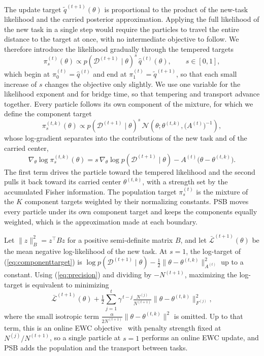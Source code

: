 \documentclass{article}
\begin{document}
The update target $\tilde q^{(t+1)}(\theta)$ is proportional to the product of the new-task likelihood and the carried posterior approximation.
Applying the full likelihood of the new task in a single step would require
the particles to travel the entire distance to the target at once, with no
intermediate objective to follow. We therefore introduce the likelihood
gradually through the tempered targets
\begin{equation}
    \pi^{(t)}_{s}(\theta)\propto p(\mathcal{D}^{(t+1)}\mid\theta)^{s}\,
    \hat q^{(t)}(\theta), \qquad s\in[0,1],
    \label{eq:tempered}
\end{equation}
which begin at $\pi^{(t)}_{0}=\hat q^{(t)}$ and end at
$\pi^{(t)}_{1}=\tilde q^{(t+1)}$, so that each small increase of $s$ changes
the objective only slightly. We use one variable for the likelihood exponent
and for bridge time, so that tempering and transport advance together. Every
particle follows its own component of the mixture, for which we define the
component target
\begin{equation}
    \pi^{(t,k)}_{s}(\theta)\propto p(\mathcal{D}^{(t+1)}\mid\theta)^{s}\,
    \mathcal{N}\!\left(\theta;\theta^{(t,k)},\big(A^{(t)}\big)^{-1}\right),
    \label{eq:componenttarget}
\end{equation}
whose log-gradient separates into the contributions of the new task and of the
carried center,
\begin{equation}
    \nabla_\theta\log\pi^{(t,k)}_{s}(\theta)
    = s\,\nabla_\theta\log p(\mathcal{D}^{(t+1)}\mid\theta)
      -A^{(t)}\big(\theta-\theta^{(t,k)}\big).
\label{eq:tempgrad}
\end{equation}
The first term drives the particle toward the tempered likelihood and the
second pulls it back toward its carried center $\theta^{(t,k)}$, with a
strength set by the accumulated Fisher information. The population target
$\pi^{(t)}_{s}$ is the mixture of the $K$ component targets weighted by their
normalizing constants. PSB moves every particle under its own component target
and keeps the components equally weighted, which is the approximation made at
each boundary.

Let $\|z\|_B^2=z^{\top}Bz$ for a positive semi-definite matrix $B$, and let $\bar{\mathcal L}^{(t+1)}(\theta)$ be the mean negative log-likelihood of the new task. At $s=1$, the log-target
of (\ref{eq:componenttarget}) is
$\log p(\mathcal{D}^{(t+1)}\mid\theta)-\tfrac12\|\theta-\theta^{(t,k)}\|_{A^{(t)}}^2$
up to a constant. Using (\ref{eq:precision}) and dividing by
$-N^{(t+1)}$, maximizing the log-target is equivalent to minimizing
\begin{equation}
    \bar{\mathcal L}^{(t+1)}(\theta)
    +\tfrac{1}{2}\textstyle\sum_{j=1}^{t}\gamma^{\,t-j}\tfrac{N^{(j)}}{N^{(t+1)}}
    \big\|\theta-\theta^{(t,k)}\big\|_{F^{(j)}}^{2},
    \label{eq:ewc}
\end{equation}
where the small isotropic term
$\tfrac{\alpha}{2N^{(t+1)}}\|\theta-\theta^{(t,k)}\|^2$ is omitted. Up to that
term, this is an online EWC objective~\cite{kirkpatrick2017ewc,schwarz2018progress}
with penalty strength fixed at $N^{(j)}/N^{(t+1)}$, so a single particle at
$s=1$ performs an online EWC update, and PSB adds the population and the
transport between tasks.
\end{document}
